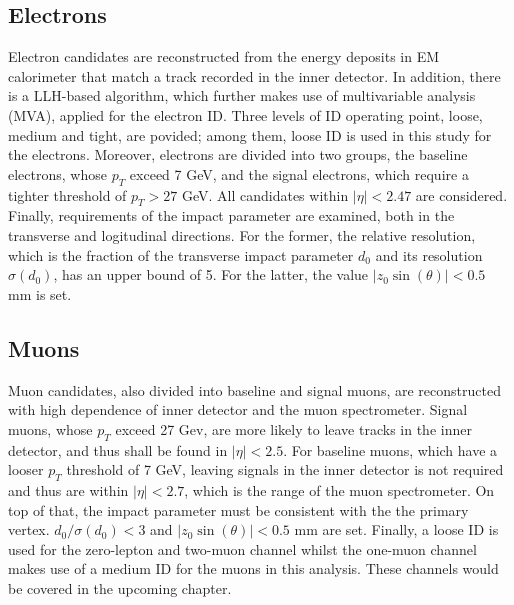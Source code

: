 \documentclass[class=NCU_thesis, crop=false]{standalone}
\begin{document}
	\subsection{Electrons}
		Electron candidates are reconstructed from the energy deposits in EM calorimeter that match a track recorded in the inner detector. In addition, there is a LLH-based algorithm, which further makes use of multivariable analysis (MVA), applied for the electron ID. Three levels of ID operating point, loose, medium and tight, are povided; among them, loose ID is used in this study for the electrons. Moreover, electrons are divided into two groups, the baseline electrons, whose $p_T$ exceed 7 GeV, and the signal electrons, which require a tighter threshold of $p_T > 27$ GeV. All candidates within $\lvert \eta \rvert < 2.47$ are considered. Finally, requirements of the impact parameter are examined, both in the transverse and logitudinal directions. For the former, the relative resolution, which is the fraction of the transverse impact parameter $d_0$ and its resolution $\sigma(d_0)$, has an upper bound of 5. For the latter, the value $\lvert z_0 \sin(\theta) \rvert < 0.5$ mm is set.
		
	\subsection{Muons}
		Muon candidates, also divided into baseline and signal muons, are reconstructed with high dependence of inner detector and the muon spectrometer. Signal muons, whose $p_T$ exceed 27 Gev, are more likely to leave tracks in the inner detector, and thus shall be found in $\lvert \eta \rvert < 2.5$. For baseline muons, which have a looser $p_T$ threshold of 7 GeV, leaving signals in the inner detector is not required and thus are within $\lvert \eta \rvert < 2.7$, which is the range of the muon spectrometer. On top of that, the impact parameter must be consistent with the the primary vertex. $d_0 / \sigma(d_0) < 3$ and $\lvert z_0 \sin(\theta) \rvert < 0.5$ mm are set. Finally, a loose ID is used for the zero-lepton and two-muon channel whilst the one-muon channel makes use of a medium ID for the muons in this analysis. These channels would be covered in the upcoming chapter.
		
\end{document}

